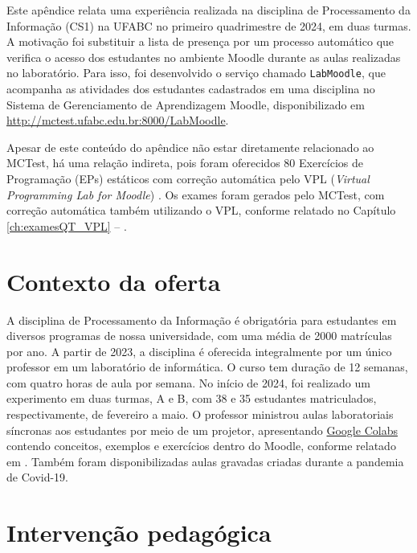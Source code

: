 \label{ch:apendice}

Este apêndice relata uma experiência realizada na disciplina de Processamento da Informação (CS1) na UFABC no primeiro quadrimestre de 2024, em duas turmas. A motivação foi substituir a lista de presença por um processo automático que verifica o acesso dos estudantes no ambiente Moodle durante as aulas realizadas no laboratório. Para isso, foi desenvolvido o serviço chamado \texttt{LabMoodle}, que acompanha as atividades dos estudantes cadastrados em uma disciplina no Sistema de Gerenciamento de Aprendizagem Moodle, disponibilizado em \url{http://mctest.ufabc.edu.br:8000/LabMoodle}.

Apesar de este conteúdo do apêndice não estar diretamente relacionado ao MCTest, há uma relação indireta, pois foram oferecidos 80 Exercícios de Programação (EPs) estáticos com correção automática pelo VPL (\textit{Virtual Programming Lab for Moodle}) \cite{rodriguez2012virtual}. Os exames foram gerados pelo MCTest, com correção automática também utilizando o VPL, conforme relatado no Capítulo \ref{ch:examesQT_VPL} -- .

\section{Contexto da oferta}

A disciplina de Processamento da Informação é obrigatória para estudantes em diversos programas de nossa universidade, com uma média de 2000 matrículas por ano. A partir de 2023, a disciplina é oferecida integralmente por um único professor em um laboratório de informática. O curso tem duração de 12 semanas, com quatro horas de aula por semana. No início de 2024, foi realizado um experimento em duas turmas, A e B, com 38 e 35 estudantes matriculados, respectivamente, de fevereiro a maio. O professor ministrou aulas laboratoriais síncronas aos estudantes por meio de um projetor, apresentando \href{https://colab.research.google.com}{Google Colabs} contendo conceitos, exemplos e exercícios dentro do Moodle, conforme relatado em . Também foram disponibilizadas aulas gravadas criadas durante a pandemia de Covid-19.

\section{Intervenção pedagógica}


